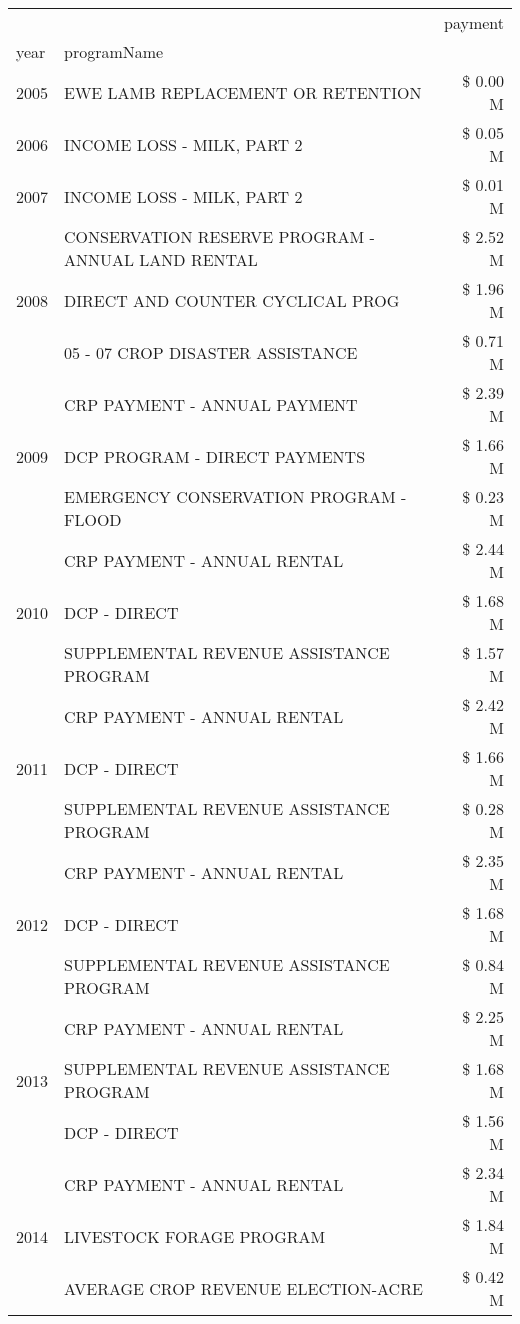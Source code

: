 \begin{tabular}{llr}
\toprule
 &  & payment \\
year & programName &  \\
\midrule
2005 & EWE LAMB REPLACEMENT OR RETENTION & \$ 0.00 M \\
\cline{1-3}
2006 & INCOME LOSS - MILK, PART 2 & \$ 0.05 M \\
\cline{1-3}
2007 & INCOME LOSS - MILK, PART 2 & \$ 0.01 M \\
\cline{1-3}
\multirow[t]{3}{*}{2008} & CONSERVATION RESERVE PROGRAM - ANNUAL LAND RENTAL & \$ 2.52 M \\
 & DIRECT AND COUNTER CYCLICAL PROG & \$ 1.96 M \\
 & 05 - 07 CROP DISASTER ASSISTANCE & \$ 0.71 M \\
\cline{1-3}
\multirow[t]{3}{*}{2009} & CRP PAYMENT - ANNUAL PAYMENT & \$ 2.39 M \\
 & DCP PROGRAM - DIRECT PAYMENTS & \$ 1.66 M \\
 & EMERGENCY CONSERVATION PROGRAM - FLOOD & \$ 0.23 M \\
\cline{1-3}
\multirow[t]{3}{*}{2010} & CRP PAYMENT - ANNUAL RENTAL & \$ 2.44 M \\
 & DCP - DIRECT & \$ 1.68 M \\
 & SUPPLEMENTAL REVENUE ASSISTANCE PROGRAM & \$ 1.57 M \\
\cline{1-3}
\multirow[t]{3}{*}{2011} & CRP PAYMENT - ANNUAL RENTAL & \$ 2.42 M \\
 & DCP - DIRECT & \$ 1.66 M \\
 & SUPPLEMENTAL REVENUE ASSISTANCE PROGRAM & \$ 0.28 M \\
\cline{1-3}
\multirow[t]{3}{*}{2012} & CRP PAYMENT - ANNUAL RENTAL & \$ 2.35 M \\
 & DCP - DIRECT & \$ 1.68 M \\
 & SUPPLEMENTAL REVENUE ASSISTANCE PROGRAM & \$ 0.84 M \\
\cline{1-3}
\multirow[t]{3}{*}{2013} & CRP PAYMENT - ANNUAL RENTAL & \$ 2.25 M \\
 & SUPPLEMENTAL REVENUE ASSISTANCE PROGRAM & \$ 1.68 M \\
 & DCP - DIRECT & \$ 1.56 M \\
\cline{1-3}
\multirow[t]{3}{*}{2014} & CRP PAYMENT - ANNUAL RENTAL & \$ 2.34 M \\
 & LIVESTOCK FORAGE PROGRAM & \$ 1.84 M \\
 & AVERAGE CROP REVENUE ELECTION-ACRE & \$ 0.42 M \\
\cline{1-3}

\end{tabular}
